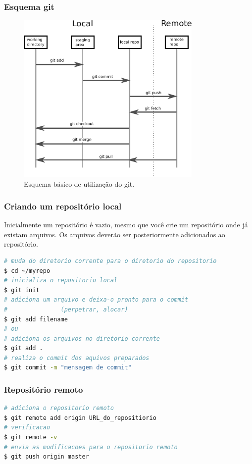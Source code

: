 \begin{frame}
\frametitle{Esquema git}
\begin{figure}[h]
\centering
\includegraphics[width=0.8\textwidth,height=0.75\textheight,keepaspectratio]{figures/git-schema.pdf}
\caption{Esquema básico de utilização do git.}
\label{fig-git-schema}
\end{figure}
\end{frame}


\begin{frame}[fragile]
\frametitle{Criando um repositório local}
Inicialmente um repositório é vazio, mesmo que você
crie um repositório onde já existam arquivos.
Os arquivos deverão ser posteriormente adicionados 
ao repositório.

\begin{lstlisting}[language=bash, label=lst-git-repo, caption={Passos para criar um repositório local no Linux.}, postbreak=\mbox{$\hookrightarrow$\space}, basicstyle=\fontsize{8}{10}\selectfont\ttfamily]
# muda do diretorio corrente para o diretorio do repositorio
$ cd ~/myrepo
# inicializa o repositorio local
$ git init
# adiciona um arquivo e deixa-o pronto para o commit 
#               (perpetrar, alocar)
$ git add filename
# ou
# adiciona os arquivos no diretorio corrente
$ git add .
# realiza o commit dos aquivos preparados
$ git commit -m "mensagem de commit"
\end{lstlisting}
\end{frame}

\begin{frame}[fragile]
\frametitle{Repositório remoto}

\begin{lstlisting}[language=bash, label=lst-git-repo2, caption={Adicionando um repositório remoto.}, postbreak=\mbox{$\hookrightarrow$\space}, basicstyle=\fontsize{8}{10}\selectfont\ttfamily]
# adiciona o repositorio remoto
$ git remote add origin URL_do_repositiorio
# verificacao
$ git remote -v
# envia as modificacoes para o repositorio remoto
$ git push origin master
\end{lstlisting}
\end{frame}

